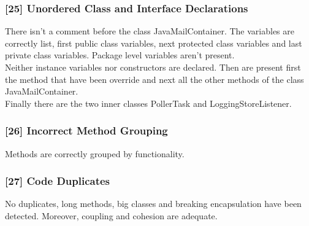 \subsubsection{[25] Unordered Class and Interface Declarations}
There isn't a comment before the class JavaMailContainer. 
The variables are correctly list, first public class variables, next protected class variables and last private class variables. Package level variables aren't present.
\\Neither instance variables nor constructors are declared. Then are present first the method that have been override and next all the other methods of the class JavaMailContainer. 
\\Finally there are the two inner classes PollerTask and LoggingStoreListener.


\subsubsection{[26] Incorrect Method Grouping}
Methods are correctly grouped by functionality.

\subsubsection{[27] Code Duplicates}
No duplicates, long methods, big classes and breaking encapsulation have been detected.
Moreover, coupling and cohesion are adequate.